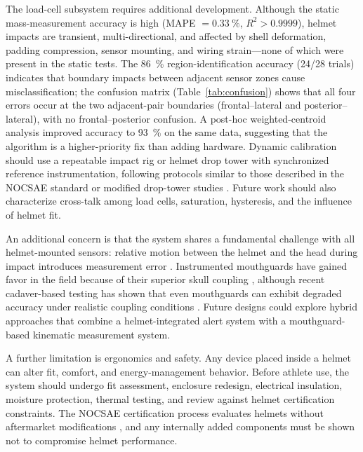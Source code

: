 \documentclass[11pt]{article}
\begin{document}
The load-cell subsystem requires additional development. Although the static mass-measurement accuracy is high (MAPE $= \SI{0.33}{\percent}$, $R^2 > 0.9999$), helmet impacts are transient, multi-directional, and affected by shell deformation, padding compression, sensor mounting, and wiring strain---none of which were present in the static tests. The \SI{86}{\percent} region-identification accuracy (24/28 trials) indicates that boundary impacts between adjacent sensor zones cause misclassification; the confusion matrix (Table~\ref{tab:confusion}) shows that all four errors occur at the two adjacent-pair boundaries (frontal--lateral and posterior--lateral), with no frontal--posterior confusion. A post-hoc weighted-centroid analysis improved accuracy to \SI{93}{\percent} on the same data, suggesting that the algorithm is a higher-priority fix than adding hardware. Dynamic calibration should use a repeatable impact rig or helmet drop tower with synchronized reference instrumentation, following protocols similar to those described in the NOCSAE standard or modified drop-tower studies \citep{nocsae2024droptest,bartsch2017modified}. Future work should also characterize cross-talk among load cells, saturation, hysteresis, and the influence of helmet fit.

An additional concern is that the system shares a fundamental challenge with all helmet-mounted sensors: relative motion between the helmet and the head during impact introduces measurement error \citep{jadischke2013accuracy,beckwith2020video}. Instrumented mouthguards have gained favor in the field because of their superior skull coupling \citep{liu2020validation,campolettano2020onfield}, although recent cadaver-based testing has shown that even mouthguards can exhibit degraded accuracy under realistic coupling conditions \citep{decker2024decoupling}. Future designs could explore hybrid approaches that combine a helmet-integrated alert system with a mouthguard-based kinematic measurement system.

A further limitation is ergonomics and safety. Any device placed inside a helmet can alter fit, comfort, and energy-management behavior. Before athlete use, the system should undergo fit assessment, enclosure redesign, electrical insulation, moisture protection, thermal testing, and review against helmet certification constraints. The NOCSAE certification process evaluates helmets without aftermarket modifications \citep{nocsae2024droptest}, and any internally added components must be shown not to compromise helmet performance.
\end{document}
